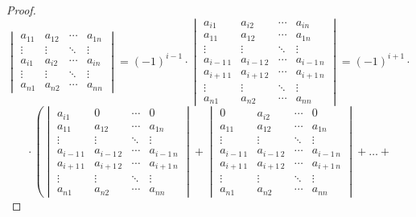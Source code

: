 \begin{proof}
\begin{equation*}
\begin{vmatrix}
a_{11} & a_{12} & \cdots & a_{1n} \\
\vdots & \vdots & \ddots & \vdots \\
a_{i1} & a_{i2} & \cdots & a_{in} \\
\vdots & \vdots & \ddots & \vdots \\
a_{n1} & a_{n2} & \cdots & a_{nn}
\end{vmatrix} =
(-1)^{i-1} \cdot
\begin{vmatrix}
a_{i1} & a_{i2} & \cdots & a_{in} \\
a_{11} & a_{12} & \cdots & a_{1n} \\
\vdots & \vdots & \ddots & \vdots \\
a_{i-1\, 1} & a_{i-1\, 2} & \cdots & a_{i-1\, n} \\
a_{i+1\, 1} & a_{i+1\, 2} & \cdots & a_{i+1\, n} \\
\vdots & \vdots & \ddots & \vdots \\
a_{n1} & a_{n2} & \cdots & a_{nn}
\end{vmatrix} =
(-1)^{i+1} \cdot {}
\end{equation*}
\begin{equation*}
{} \cdot \left(
\begin{vmatrix}
a_{i1} & 0 & \cdots & 0 \\
a_{11} & a_{12} & \cdots & a_{1n} \\
\vdots & \vdots & \ddots & \vdots \\
a_{i-1\, 1} & a_{i-1\, 2} & \cdots & a_{i-1\, n} \\
a_{i+1\, 1} & a_{i+1\, 2} & \cdots & a_{i+1\, n} \\
\vdots & \vdots & \ddots & \vdots \\
a_{n1} & a_{n2} & \cdots & a_{nn}
\end{vmatrix} +
\begin{vmatrix}
0 & a_{i2} & \cdots & 0 \\
a_{11} & a_{12} & \cdots & a_{1n} \\
\vdots & \vdots & \ddots & \vdots \\
a_{i-1\, 1} & a_{i-1\, 2} & \cdots & a_{i-1\, n} \\
a_{i+1\, 1} & a_{i+1\, 2} & \cdots & a_{i+1\, n} \\
\vdots & \vdots & \ddots & \vdots \\
a_{n1} & a_{n2} & \cdots & a_{nn}
\end{vmatrix} + \ldots + 

\end{equation*}
\end{proof}
